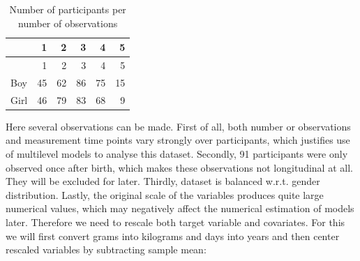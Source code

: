 \documentclass[
  12pt,
]{article}
\begin{document}
\begin{longtable}[]{@{}lrrrrr@{}}
\caption{Number of participants per number of
observations}\tabularnewline
\toprule\noalign{}
& 1 & 2 & 3 & 4 & 5 \\
\midrule\noalign{}
\endfirsthead
\toprule\noalign{}
& 1 & 2 & 3 & 4 & 5 \\
\midrule\noalign{}
\endhead
\bottomrule\noalign{}
\endlastfoot
Boy & 45 & 62 & 86 & 75 & 15 \\
Girl & 46 & 79 & 83 & 68 & 9 \\
\end{longtable}

Here several observations can be made. First of all, both number or
observations and measurement time points vary strongly over
participants, which justifies use of multilevel models to analyse this
dataset. Secondly, 91 participants were only observed once after birth,
which makes these observations not longitudinal at all. They will be
excluded for later. Thirdly, dataset is balanced w.r.t. gender
distribution. Lastly, the original scale of the variables produces quite
large numerical values, which may negatively affect the numerical
estimation of models later. Therefore we need to rescale both target
variable and covariates. For this we will first convert grams into
kilograms and days into years and then center rescaled variables by
subtracting sample mean:
\end{document}
